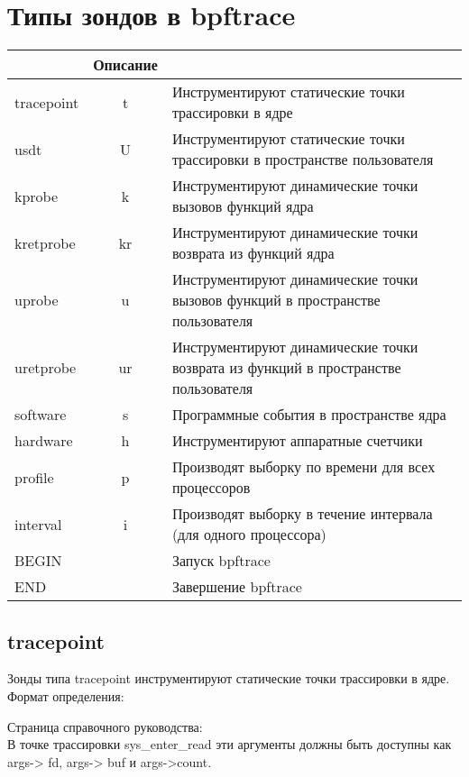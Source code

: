 \section{Типы зондов в bpftrace}

\begin{tabular}{|l|c|p{12cm}|}
\hline
\rowcolor{gray!40}
\multicolumn{2}{|c|}{Тип (Псевдоним)} & Описание \\
\hline
tracepoint & t & Инструментируют статические точки трассировки в ядре  \\
\hline
usdt & U & Инструментируют статические точки трассировки в пространстве пользователя  \\
\hline
kprobe & k & Инструментируют динамические точки вызовов функций ядра  \\
\hline
kretprobe & kr & Инструментируют динамические точки возврата из функций ядра  \\
\hline
uprobe & u & Инструментируют динамические точки вызовов функций в пространстве пользователя  \\
\hline
uretprobe & ur & Инструментируют динамические точки возврата из функций в пространстве пользователя  \\
\hline
software & s & Программные события в пространстве ядра  \\
\hline
hardware & h & Инструментируют аппаратные счетчики  \\
\hline
profile & p & Производят выборку по времени для всех процессоров  \\
\hline
interval & i & Производят выборку в течение интервала (для одного процессора)  \\
\hline
BEGIN & & Запуск bpftrace  \\
\hline
END & & Завершение bpftrace  \\
\hline
\end{tabular}

\subsection{tracepoint}
Зонды типа tracepoint инструментируют статические точки трассировки в ядре.
Формат определения: \\

\noindent Страница справочного руководства: \\
В точке трассировки sys\_enter\_read эти аргументы должны быть доступны как
args-> fd, args-> buf и args->count. \\

